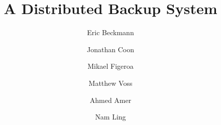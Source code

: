 \documentclass{scu-thesis}
\author{Eric Beckmann}
\author{Jonathan Coon}
\author{Mikael Figeroa}
\author{Matthew Voss}
\title{A Distributed Backup System}
\begin{document}
\frontmatter
\signature{Ahmed Amer}
\signature{Nam Ling}

\maketitle


\tableofcontents
\listoffigures

\mainmatter


\backmatter
\end{document}
